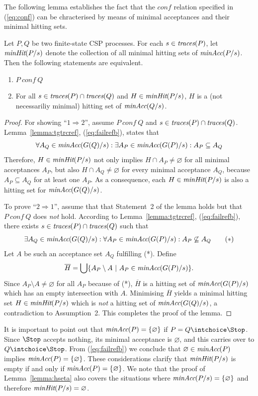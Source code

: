 The following lemma establishes the fact that the $conf$ relation specified in (\ref{eq:conf}) can be chracterised by means of minimal acceptances and their
minimal hitting sets.
\begin{lemma}
\label{lemma:hseta}
Let $P, Q$ be two finite-state CSP processes.
For each $s\in\text{\it traces}(P)$,
let $\text{\it minHit}(P/s)$ denote the
collection of all minimal hitting sets of $\text{\it minAcc}(P/s)$.
Then the following statements are equivalent.
\begin{enumerate}
\item $P\ conf\ Q$  

\item For all $s\in\text{\it traces}(P)\cap \text{\it traces}(Q)$ and $H \in  \text{\it minHit}(P/s)$, $H$ is
a (not necessariliy minimal) hitting set of $\text{\it minAcc}(Q/s)$.
\end{enumerate}
\end{lemma}
\begin{proof}
For showing ``$1 \Rightarrow 2$'', assume   $P\ conf\ Q$ and  
  $s\in\text{\it traces}(P)\cap \text{\it traces}(Q)$. Lemma~\ref{lemma:tgtrcref},
(\ref{eq:failrefb}), states that
\[
\forall A_Q\in\text{\it minAcc}(G(Q)/s):
\exists A_P\in\text{\it minAcc}(G(P)/s): A_P\subseteq A_Q
\]
Therefore, $H \in  \text{\it minHit}(P/s)$ not only implies $H\cap
A_P\neq\varnothing$ for all minimal acceptances $A_P$, but also $H\cap
A_Q\neq\varnothing$ for every minimal acceptance $A_Q$, because $A_P\subseteq
A_Q$ for at least one $A_P$. As a consequence, each $H \in
\text{\it minHit}(P/s)$ is also a hitting set for $\text{\it minAcc}(G(Q)/s)$.

To prove ``$2 \Rightarrow 1$'', assume that that Statement~2 of the lemma holds but 
that  $P\ conf\ Q$ does {\it not} hold. 
According to Lemma~\ref{lemma:tgtrcref}, (\ref{eq:failrefb}), there
exists $s\in\text{\it traces}(P)\cap \text{\it traces}(Q)$ such that
\[
\exists A_Q\in\text{\it minAcc}(G(Q)/s): \forall A_P\in\text{\it minAcc}(G(P)/s): A_P\not\subseteq A_Q
\qquad (*)
\]
Let $A$ be such an acceptance set $A_Q$ fulfilling (*).
Define
\[
\overline H = \bigcup\{ A_P \setminus A~|~A_P\in\text{\it minAcc}(G(P)/s) \}.
\]
Since $A_P \setminus A \neq\varnothing$ for all $A_P$ because of (*),
$\overline H$ is a hitting set of $\text{\it minAcc}(G(P)/s)$ which has an  empty
intersection with $A$. 
Minimising $\overline H$ yields   a minimal hitting set $H\in
\text{\it minHit}(P/s)$ which is {\it not} a hitting set of $\text{\it minAcc}(G(Q)/s)$, a
contradiction to Assumption~2. This completes the proof of the lemma. \xbox
\end{proof}
%

It is important to point out that $\text{\it minAcc}(P) = \{ \varnothing \}$ if $P = Q\intchoice \Stop$. Since $\Stop$ accepts nothing, its minimal acceptance is $\varnothing$, and this carries over to $Q\intchoice \Stop$.  From (\ref{eq:failrefb}) we conclude that 
$\varnothing\in\text{\it minAcc}(P)$ implies $\text{\it minAcc}(P) = \{ \varnothing \}$. These considerations
clarify that $\text{\it minHit}(P/s)$ is empty if and only if  $\text{\it minAcc}(P) = \{ \varnothing \}$.
We note that the proof of Lemma~\ref{lemma:hseta} also covers the situations where
$\text{\it minAcc}(P/s) = \{ \varnothing \}$ and therefore  $\text{\it minHit}(P/s) = \varnothing$. 


 